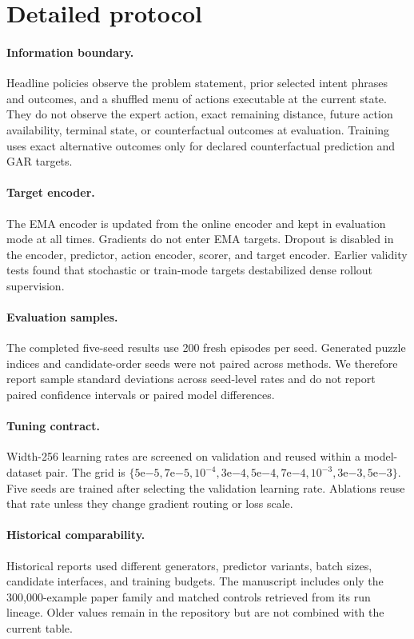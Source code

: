 \section{Detailed protocol}
\label{app:protocol}

\paragraph{Information boundary.}
Headline policies observe the problem statement, prior selected intent phrases and outcomes, and a shuffled menu of actions executable at the current state. They do not observe the expert action, exact remaining distance, future action availability, terminal state, or counterfactual outcomes at evaluation. Training uses exact alternative outcomes only for declared counterfactual prediction and GAR targets.

\paragraph{Target encoder.}
The EMA encoder is updated from the online encoder and kept in evaluation mode at all times. Gradients do not enter EMA targets. Dropout is disabled in the encoder, predictor, action encoder, scorer, and target encoder. Earlier validity tests found that stochastic or train-mode targets destabilized dense rollout supervision.

\paragraph{Evaluation samples.}
The completed five-seed results use 200 fresh episodes per seed. Generated puzzle indices and candidate-order seeds were not paired across methods. We therefore report sample standard deviations across seed-level rates and do not report paired confidence intervals or paired model differences.

\paragraph{Tuning contract.}
Width-256 learning rates are screened on validation and reused within a model-dataset pair. The grid is $\{5\mathrm{e}{-5},7\mathrm{e}{-5},10^{-4},3\mathrm{e}{-4},5\mathrm{e}{-4},7\mathrm{e}{-4},10^{-3},3\mathrm{e}{-3},5\mathrm{e}{-3}\}$. Five seeds are trained after selecting the validation learning rate. Ablations reuse that rate unless they change gradient routing or loss scale.

\paragraph{Historical comparability.}
Historical reports used different generators, predictor variants, batch sizes, candidate interfaces, and training budgets. The manuscript includes only the 300,000-example paper family and matched controls retrieved from its run lineage. Older values remain in the repository but are not combined with the current table.
